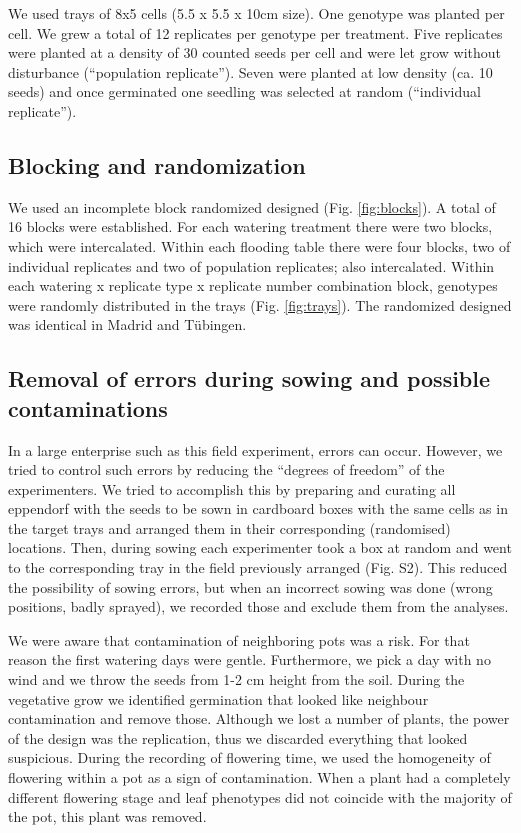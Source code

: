 \documentclass[12pt,]{article}
\begin{document}
We used trays of 8x5 cells (5.5 x 5.5 x 10cm size). One genotype was
planted per cell. We grew a total of 12 replicates per genotype per
treatment. Five replicates were planted at a density of 30 counted seeds
per cell and were let grow without disturbance (``population
replicate''). Seven were planted at low density (ca. 10 seeds) and once
germinated one seedling was selected at random (``individual
replicate'').

\subsection{Blocking and
randomization}\label{blocking-and-randomization}

We used an incomplete block randomized designed (Fig. \ref{fig:blocks}).
A total of 16 blocks were established. For each watering treatment there
were two blocks, which were intercalated. Within each flooding table
there were four blocks, two of individual replicates and two of
population replicates; also intercalated. Within each watering x
replicate type x replicate number combination block, genotypes were
randomly distributed in the trays (Fig. \ref{fig:trays}). The randomized
designed was identical in Madrid and Tübingen.

\subsection{Removal of errors during sowing and possible
contaminations}\label{removal-of-errors-during-sowing-and-possible-contaminations}

In a large enterprise such as this field experiment, errors can occur.
However, we tried to control such errors by reducing the ``degrees of
freedom'' of the experimenters. We tried to accomplish this by preparing
and curating all eppendorf with the seeds to be sown in cardboard boxes
with the same cells as in the target trays and arranged them in their
corresponding (randomised) locations. Then, during sowing each
experimenter took a box at random and went to the corresponding tray in
the field previously arranged (Fig. S2). This reduced the possibility of
sowing errors, but when an incorrect sowing was done (wrong positions,
badly sprayed), we recorded those and exclude them from the analyses.

We were aware that contamination of neighboring pots was a risk. For
that reason the first watering days were gentle. Furthermore, we pick a
day with no wind and we throw the seeds from 1-2 cm height from the
soil. During the vegetative grow we identified germination that looked
like neighbour contamination and remove those. Although we lost a number
of plants, the power of the design was the replication, thus we
discarded everything that looked suspicious. During the recording of
flowering time, we used the homogeneity of flowering within a pot as a
sign of contamination. When a plant had a completely different flowering
stage and leaf phenotypes did not coincide with the majority of the pot,
this plant was removed.
\end{document}
